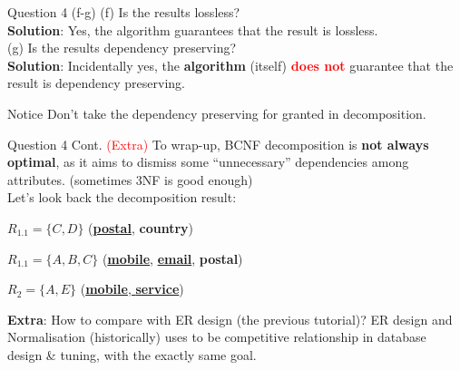 \begin{frame}[fragile]{Question 4 (f-g)}
(f) Is the results lossless?\\\vspace{5pt}
\textbf{Solution}: Yes, the algorithm guarantees that the result is lossless.\\
\vspace{30pt}
(g) Is the results dependency preserving?\\\vspace{5pt}
\textbf{Solution}:
Incidentally yes, the \textbf{algorithm} (itself) \textcolor{red}{\textbf{does not}} guarantee that the result is dependency preserving.\\
\begin{alertblock}{Notice}
	Don't take the dependency preserving for granted in decomposition.
\end{alertblock}

\end{frame}

\begin{frame}[fragile]{Question 4 Cont. \textcolor{red}{(Extra)}}
To wrap-up, BCNF decomposition is \textbf{not always optimal}, as it aims to dismiss some ``unnecessary'' dependencies among attributes. (sometimes 3NF is good enough)\\\vspace{5pt}
Let's look back the decomposition result:

$R_{1.1}=\{C, D\}$ (\textbf{\underline{postal}}, \textbf{country})

$R_{1.1}=\{A, B, C\}$ (\textbf{\underline{mobile}}, \textbf{\underline{email}}, \textbf{postal})

$R_{2}=\{A, E\}$ (\underline{\textbf{mobile}, \textbf{service}})\\\vspace{5pt}

\textbf{Extra}:
How to compare with ER design (the previous tutorial)? ER design and Normalisation (historically) uses to be competitive relationship in database design \& tuning, with the exactly same goal.\\\vspace{5pt}
\end{frame}


